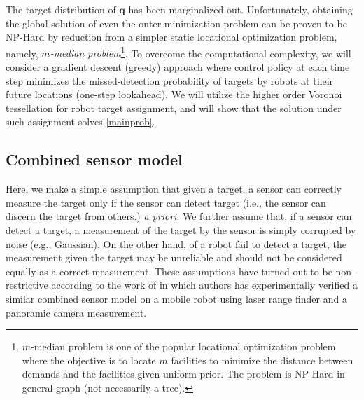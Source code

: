 \documentclass[letterpaper, 10 pt, conference]{ieeeconf}
\begin{document}
The target distribution of $\bm{q}$ has been marginalized out. Unfortunately, obtaining the global solution of even the outer minimization problem can be proven to be NP-Hard by reduction from a simpler static locational optimization problem, namely, \emph{$m$-median problem}\footnote{$m$-median problem is one of the popular locational optimization problem where the objective is to locate $m$ facilities to minimize the distance between demands and the facilities given uniform prior. The problem is NP-Hard in general graph (not necessarily a tree).}. To overcome the computational complexity, we will consider a gradient descent (greedy) approach where control policy at each time step minimizes the missed-detection probability of targets by robots at their future locations (one-step lookahead). We will utilize the higher order Voronoi tessellation \cite{shamos1975closest} for robot target assignment, and will show that the solution under such assignment solves \eqref{mainprob}.




\subsection{Combined sensor model}
\label{sec:sec24}
Here, we make a simple assumption that given a target, a sensor can correctly measure the target only if the sensor can detect target (i.e., the sensor can discern the target from others.) \emph{a priori}.
We further assume that, if a sensor can detect a target, a measurement of the target by the sensor is simply corrupted by noise (e.g., Gaussian). On the other hand, of a robot fail to detect a target, the measurement given the target may be unreliable and should not be considered equally as a correct measurement. These assumptions have turned out to be non-restrictive according to the work of \cite{anguelov2004detecting} in which authors has experimentally verified a similar combined sensor model 
on a mobile robot using laser range finder and a panoramic camera measurement.
\end{document}
